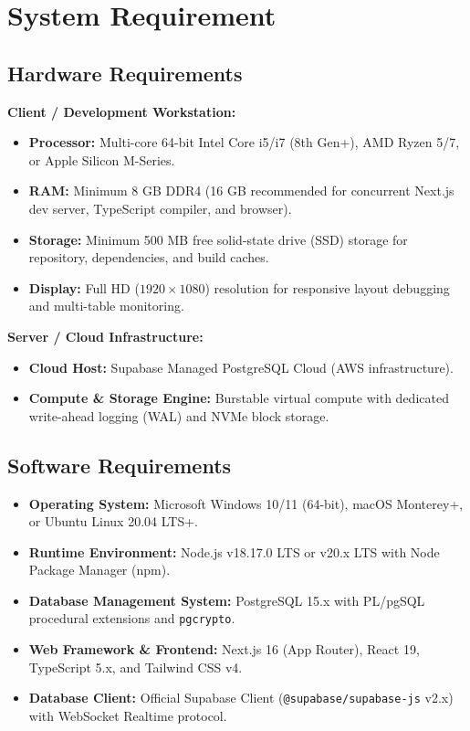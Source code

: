 \chapter{System Requirement}

\section{Hardware Requirements}
\textbf{Client / Development Workstation:}
\begin{itemize}[itemsep=1.5pt, topsep=2pt, parsep=0pt]
    \item \textbf{Processor:} Multi-core 64-bit Intel Core i5/i7 (8th Gen+), AMD Ryzen 5/7, or Apple Silicon M-Series.
    \item \textbf{RAM:} Minimum 8 GB DDR4 (16 GB recommended for concurrent Next.js dev server, TypeScript compiler, and browser).
    \item \textbf{Storage:} Minimum 500 MB free solid-state drive (SSD) storage for repository, dependencies, and build caches.
    \item \textbf{Display:} Full HD ($1920 \times 1080$) resolution for responsive layout debugging and multi-table monitoring.
\end{itemize}

\textbf{Server / Cloud Infrastructure:}
\begin{itemize}[itemsep=1.5pt, topsep=2pt, parsep=0pt]
    \item \textbf{Cloud Host:} Supabase Managed PostgreSQL Cloud (AWS infrastructure).
    \item \textbf{Compute \& Storage Engine:} Burstable virtual compute with dedicated write-ahead logging (WAL) and NVMe block storage.
\end{itemize}

\section{Software Requirements}
\begin{itemize}[itemsep=1.5pt, topsep=2pt, parsep=0pt]
    \item \textbf{Operating System:} Microsoft Windows 10/11 (64-bit), macOS Monterey+, or Ubuntu Linux 20.04 LTS+.
    \item \textbf{Runtime Environment:} Node.js v18.17.0 LTS or v20.x LTS with Node Package Manager (npm).
    \item \textbf{Database Management System:} PostgreSQL 15.x with PL/pgSQL procedural extensions and \texttt{pgcrypto}.
    \item \textbf{Web Framework \& Frontend:} Next.js 16 (App Router), React 19, TypeScript 5.x, and Tailwind CSS v4.
    \item \textbf{Database Client:} Official Supabase Client (\texttt{@supabase/supabase-js} v2.x) with WebSocket Realtime protocol.
\end{itemize}

